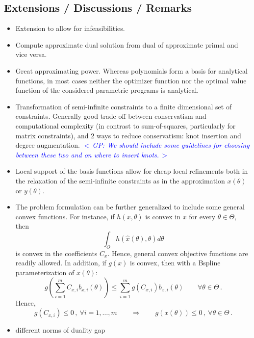 \documentclass{article}
\newcommand{\ppar}{\theta}                  %
\newcommand{\Ppar}{\Theta}                  %
\newcommand{\commentGP}[1]{\noindent \textcolor{blue}{\emph{$<\,$GP: #1$\,>$}}}%
\begin{document}
\subsection{Extensions / Discussions / Remarks}
\begin{itemize}
\item Extension to allow for infeasibilities.
\item Compute approximate dual solution from dual of approximate primal and vice versa.
\item Great approximating power. Whereas polynomials form a basis for analytical functions, in most cases neither the optimizer function nor the optimal value function of the considered parametric programs is analytical.
\item Transformation of semi-infinite constraints to a finite dimensional set of constraints. Generally good trade-off between conservatism and computational complexity (in contrast to sum-of-squares, particularly for matrix constraints), and 2 ways to reduce conservatism: knot insertion and degree augmentation. \commentGP{We should include some guidelines for choosing between these two and on where to insert knots.}
\item Local support of the basis functions allow for cheap local refinements both in the relaxation of the semi-infinite constraints as in the approximation $x(\ppar)$ or $y(\ppar)$.
 \item The problem formulation can be further generalized to include some general convex functions. For instance, if $h(x,\ppar)$ is convex in $x$ for every $\ppar\in\Ppar$, then
        \[ \int_{\Ppar} h(\hat{x}(\ppar), \ppar) d\ppar
        \]
        is convex in the coefficients $C_x$. Hence, general convex objective functions are readily allowed. In addition, if $g(x)$ is convex, then with a Bspline parameterization of $x(\ppar)$:
        \[ g\left(\sum_{i=1}^m C_{x,i} b_{x,i}(\ppar)\right) \leq \sum_{i=1}^m g(C_{x,i}) b_{x,i}(\ppar) \qquad \forall \ppar\in\Ppar\,. %
        \]
        Hence,
        \[ g(C_{x,i})\leq 0\,,~\forall i=1,\ldots,m \qquad \Rightarrow \qquad g(x(\ppar))\leq0\,,~\forall \ppar\in\Ppar\,.%
        \]
\item different norms of duality gap
\end{itemize}  
\end{document}
